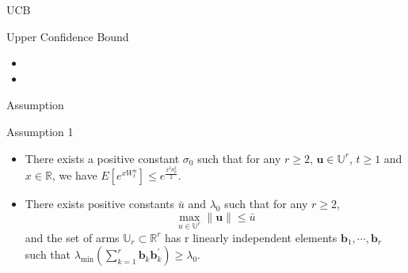 \documentclass[serif]{beamer}
\begin{document}
\begin{frame}{UCB}

\begin{block}{Upper Confidence Bound}
\begin{itemize}
\item 
\item 
\end{itemize}
\end{block}

\end{frame}


\begin{frame}{Assumption}

\begin{block}{Assumption 1}
\begin{itemize}
\item There exists a positive constant $\sigma_{0}$ such that for any $r\geq 2$, $\textbf{u}\in \mathbb{U}^{r}$, $t\geq 1$ and $x\in \mathbb{R}$, we have $E[e^{x W_{t}^{u}}]\leq e^{\frac{x^{2}\sigma_{0}^{2}}{2}}$.
\item There exists positive constants $\bar{u}$ and $\lambda_{0}$ such that for any $r\geq 2$,
\begin{equation}
\max_{u\in \mathbb{U}^{r}}\|\textbf{u}\|\leq \bar{u} \nonumber
\end{equation}
and the set of arms $\mathbb{U}_{r}\subset 
\mathbb{R}^{r}$ has r linearly independent elements $\textbf{b}_{1},\cdots,\textbf{b}_{r}$ such that $\lambda_{\min}(\sum_{k=1}^{r}\textbf{b}_{k}\textbf{b}_{k}^{'})\geq \lambda_{0}$.
\end{itemize}



\end{block}

\end{frame}
\end{document}
